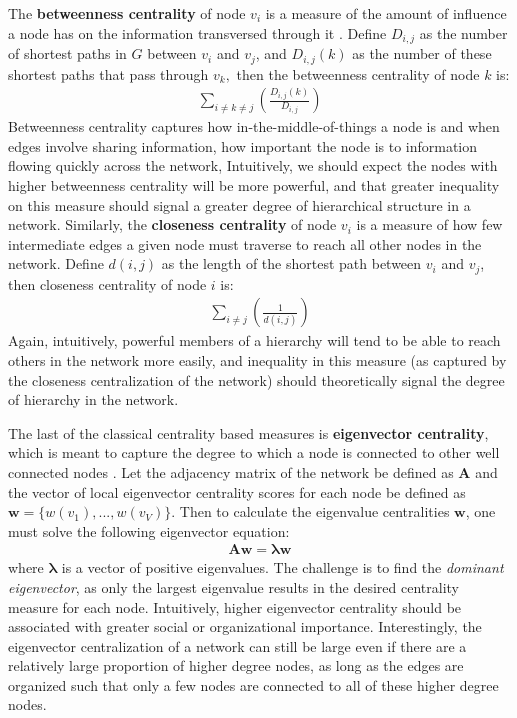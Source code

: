 \documentclass[3p,times]{elsarticle}
\begin{document}
The \textbf{betweenness centrality} of node $v_{i}$ is a measure of the amount of influence a node has on the information transversed through it \cite{between}. Define $D_{i,j}$ as the number of shortest paths in $G$ between $v_{i}$ and $v_{j}$, and $D_{i,j}(k)$ as the number of these shortest paths that pass through $v_{k},$ then the betweenness centrality of node $k$ is:
\begin{align}
	\sum_{i\neq k\neq j}{(\frac{D_{i,j}(k)}{D_{i,j}})}
\end{align}
Betweenness centrality captures how in-the-middle-of-things a node is and when edges involve sharing information, how important the node is to information flowing quickly across the network, Intuitively, we should expect the nodes with higher betweenness centrality will be more powerful, and that greater inequality on this measure should signal a greater degree of hierarchical structure in a network. Similarly, the \textbf{closeness centrality} of node $v_{i}$ is a measure of how few intermediate edges a given node must traverse to reach all other nodes in the network. Define $d(i,j)$ as the length of the shortest path between $v_{i}$ and $v_{j}$, then closeness centrality of node $i$ is: 
\begin{align}
	\sum_{i\neq j}{(\frac{1}{d(i,j)})}
\end{align}
Again, intuitively, powerful members of a hierarchy will tend to be able to reach others in the network more easily, and inequality in this measure (as captured by the closeness centralization of the network) should theoretically signal the degree of hierarchy in the network.

The last of the classical centrality based measures is \textbf{eigenvector centrality}, which is meant to capture the degree to which a node is connected to other well connected nodes \cite{eigen}. Let the adjacency matrix of the network be defined as $\mathbf{A}$ and the vector of local eigenvector centrality scores for each node be defined as $\mathbf{w}=\{w({v_{1}}),...,w(v_{V})\}$. Then to calculate the eigenvalue centralities $\mathbf{w}$, one must solve the following eigenvector equation: 
\begin{align}
	\mathbf{A}  \mathbf{w}=  \mathbf{\lambda} \mathbf{w}
\end{align}
where $\mathbf{\lambda}$ is a vector of positive eigenvalues. The challenge is to find the \emph{dominant eigenvector}, as only the largest eigenvalue results in the desired centrality measure for each node. Intuitively, higher eigenvector centrality should be associated with greater social or organizational importance. Interestingly, the eigenvector centralization of a network can still be large even if there are a relatively large proportion of higher degree nodes, as long as the edges are organized such that only a few nodes are connected to all of these higher degree nodes.
\end{document}
